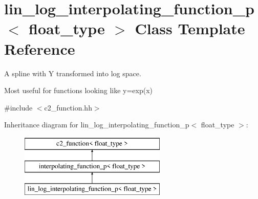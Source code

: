 \hypertarget{classlin__log__interpolating__function__p}{\section{lin\-\_\-log\-\_\-interpolating\-\_\-function\-\_\-p$<$ float\-\_\-type $>$ Class Template Reference}
\label{classlin__log__interpolating__function__p}
}


A spline with Y transformed into log space.

Most useful for functions looking like y=exp(x)  




{\ttfamily \#include $<$c2\-\_\-function.\-hh$>$}

Inheritance diagram for lin\-\_\-log\-\_\-interpolating\-\_\-function\-\_\-p$<$ float\-\_\-type $>$\-:\begin{figure}[H]
\begin{center}
\leavevmode
\includegraphics[height=3.000000cm]{classlin__log__interpolating__function__p}
\end{center}
\end{figure}

